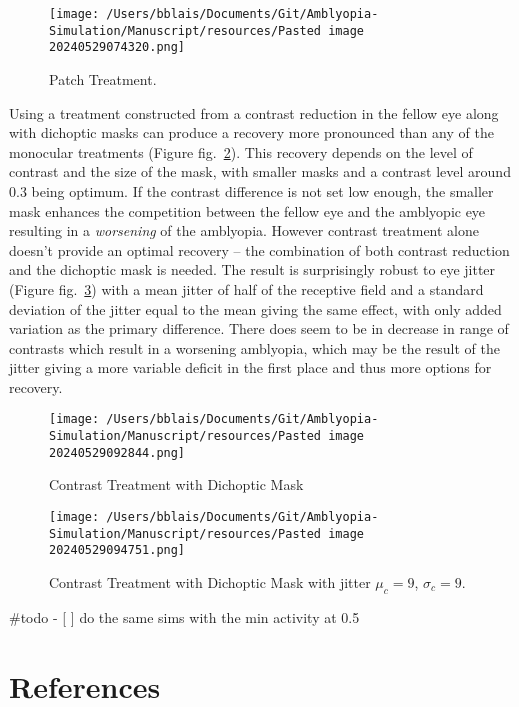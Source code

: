 \documentclass[
]{article}
\begin{document}
\begin{figure}
\centering
\texttt{[image: /Users/bblais/Documents/Git/Amblyopia-Simulation/Manuscript/resources/Pasted image 20240529074320.png]}
\caption{Patch Treatment.}\label{fig:atropine_treatment}
\end{figure}

Using a treatment constructed from a contrast reduction in the fellow
eye along with dichoptic masks can produce a recovery more pronounced
than any of the monocular treatments (Figure
fig.~\ref{fig:contrast_mask_treatment}). This recovery depends on the
level of contrast and the size of the mask, with smaller masks and a
contrast level around 0.3 being optimum. If the contrast difference is
not set low enough, the smaller mask enhances the competition between
the fellow eye and the amblyopic eye resulting in a \emph{worsening} of
the amblyopia. However contrast treatment alone doesn't provide an
optimal recovery -- the combination of both contrast reduction and the
dichoptic mask is needed. The result is surprisingly robust to eye
jitter (Figure fig.~\ref{fig:contrast_mask_treatment_mu9_sigma_9}) with
a mean jitter of half of the receptive field and a standard deviation of
the jitter equal to the mean giving the same effect, with only added
variation as the primary difference. There does seem to be in decrease
in range of contrasts which result in a worsening amblyopia, which may
be the result of the jitter giving a more variable deficit in the first
place and thus more options for recovery.

\begin{figure}
\centering
\texttt{[image: /Users/bblais/Documents/Git/Amblyopia-Simulation/Manuscript/resources/Pasted image 20240529092844.png]}
\caption{Contrast Treatment with Dichoptic
Mask}\label{fig:contrast_mask_treatment}
\end{figure}

\begin{figure}
\centering
\texttt{[image: /Users/bblais/Documents/Git/Amblyopia-Simulation/Manuscript/resources/Pasted image 20240529094751.png]}
\caption{Contrast Treatment with Dichoptic Mask with jitter \(\mu_c=9\),
\(\sigma_c=9\).}\label{fig:contrast_mask_treatment_mu9_sigma_9}
\end{figure}

\#todo - {[} {]} do the same sims with the min activity at 0.5

\section*{References}\label{sec:references}
\end{document}
